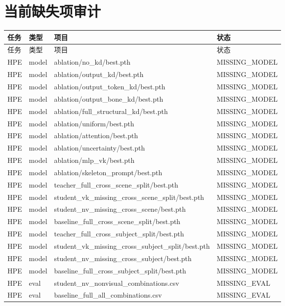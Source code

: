 \documentclass[UTF8,10pt,a4paper]{ctexart}
\begin{document}
\section{当前缺失项审计}
{\scriptsize
\begin{longtable}{llll}
\toprule
任务 & 类型 & 项目 & 状态\\
\midrule
\endfirsthead
\toprule
任务 & 类型 & 项目 & 状态\\
\midrule
\endhead
HPE & model & ablation/no\_kd/best.pth & MISSING\_MODEL\\
HPE & model & ablation/output\_kd/best.pth & MISSING\_MODEL\\
HPE & model & ablation/output\_token\_kd/best.pth & MISSING\_MODEL\\
HPE & model & ablation/output\_bone\_kd/best.pth & MISSING\_MODEL\\
HPE & model & ablation/full\_structural\_kd/best.pth & MISSING\_MODEL\\
HPE & model & ablation/uniform/best.pth & MISSING\_MODEL\\
HPE & model & ablation/attention/best.pth & MISSING\_MODEL\\
HPE & model & ablation/uncertainty/best.pth & MISSING\_MODEL\\
HPE & model & ablation/mlp\_vk/best.pth & MISSING\_MODEL\\
HPE & model & ablation/skeleton\_prompt/best.pth & MISSING\_MODEL\\
HPE & model & teacher\_full\_cross\_scene\_split/best.pth & MISSING\_MODEL\\
HPE & model & student\_vk\_missing\_cross\_scene\_split/best.pth & MISSING\_MODEL\\
HPE & model & student\_nv\_missing\_cross\_scene/best.pth & MISSING\_MODEL\\
HPE & model & baseline\_full\_cross\_scene\_split/best.pth & MISSING\_MODEL\\
HPE & model & teacher\_full\_cross\_subject\_split/best.pth & MISSING\_MODEL\\
HPE & model & student\_vk\_missing\_cross\_subject\_split/best.pth & MISSING\_MODEL\\
HPE & model & student\_nv\_missing\_cross\_subject/best.pth & MISSING\_MODEL\\
HPE & model & baseline\_full\_cross\_subject\_split/best.pth & MISSING\_MODEL\\
HPE & eval & student\_nv\_nonvisual\_combinations.csv & MISSING\_EVAL\\
HPE & eval & baseline\_full\_all\_combinations.csv & MISSING\_EVAL\\

\end{longtable}}
\end{document}
